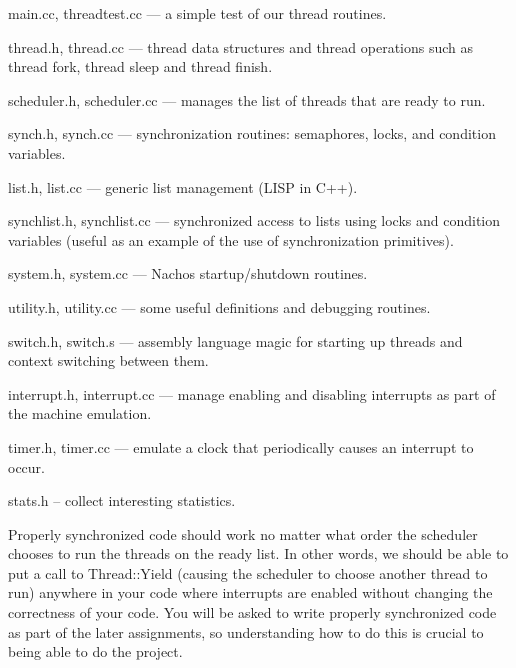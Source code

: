 \begin{description}

\item main.cc, threadtest.cc --- a simple test of our thread routines.

\item thread.h, thread.cc --- thread data structures and
thread operations such as thread fork, thread sleep and thread finish.

\item scheduler.h, scheduler.cc --- manages the list of threads that
are ready to run.

\item synch.h, synch.cc --- synchronization routines: semaphores, locks, 
and condition variables.

\item list.h, list.cc --- generic list management (LISP in C++).

\item synchlist.h, synchlist.cc --- synchronized access to lists using
locks and condition variables (useful as an example of the use 
of synchronization primitives).

\item system.h, system.cc --- Nachos startup/shutdown routines.

\item utility.h, utility.cc --- some useful definitions and debugging routines.

\item switch.h, switch.s --- assembly language magic for starting 
up threads and context switching between them.

\item interrupt.h, interrupt.cc --- manage enabling and disabling
interrupts as part of the machine emulation.

\item timer.h, timer.cc --- emulate a clock that periodically causes 
an interrupt to occur.

\item stats.h -- collect interesting statistics.

\end{description}

Properly synchronized code should work no matter what order the 
scheduler chooses to run the threads on the ready list.  In other 
words, we should be able to put a call to Thread::Yield (causing the scheduler
to choose another thread to run) anywhere in your code where interrupts 
are enabled without changing the correctness of your code.   
You will be asked to write properly synchronized code as part of the 
later assignments, so understanding how to do this is crucial to
being able to do the project.

